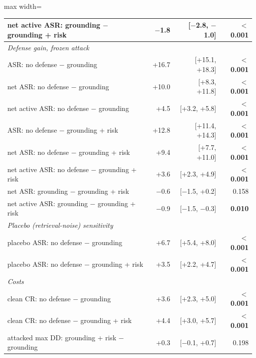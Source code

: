 \begin{table}[t]
{\begin{adjustbox}{max width=\linewidth}
\begin{tabular}{lrrr}
net active ASR: grounding $-$ grounding + risk & $-$1.8 & [$-$2.8, $-$1.0] & \textbf{$<$0.001} \\
\midrule
\multicolumn{4}{l}{\textit{Defense gain, frozen attack}} \\
ASR: no defense $-$ grounding & +16.7 & [+15.1, +18.3] & \textbf{$<$0.001} \\
net ASR: no defense $-$ grounding & +10.0 & [+8.3, +11.8] & \textbf{$<$0.001} \\
net active ASR: no defense $-$ grounding & +4.5 & [+3.2, +5.8] & \textbf{$<$0.001} \\
ASR: no defense $-$ grounding + risk & +12.8 & [+11.4, +14.3] & \textbf{$<$0.001} \\
net ASR: no defense $-$ grounding + risk & +9.4 & [+7.7, +11.0] & \textbf{$<$0.001} \\
net active ASR: no defense $-$ grounding + risk & +3.6 & [+2.3, +4.9] & \textbf{$<$0.001} \\
net ASR: grounding $-$ grounding + risk & $-$0.6 & [$-$1.5, +0.2] & 0.158 \\
net active ASR: grounding $-$ grounding + risk & $-$0.9 & [$-$1.5, $-$0.3] & \textbf{0.010} \\
\midrule
\multicolumn{4}{l}{\textit{Placebo (retrieval-noise) sensitivity}} \\
placebo ASR: no defense $-$ grounding & +6.7 & [+5.4, +8.0] & \textbf{$<$0.001} \\
placebo ASR: no defense $-$ grounding + risk & +3.5 & [+2.2, +4.7] & \textbf{$<$0.001} \\
\midrule
\multicolumn{4}{l}{\textit{Costs}} \\
clean CR: no defense $-$ grounding & +3.6 & [+2.3, +5.0] & \textbf{$<$0.001} \\
clean CR: no defense $-$ grounding + risk & +4.4 & [+3.0, +5.7] & \textbf{$<$0.001} \\
attacked max DD: grounding + risk $-$ grounding & +0.3 & [$-$0.1, +0.7] & 0.198 \\
\bottomrule
\end{tabular}
\end{adjustbox}
}
\end{table}